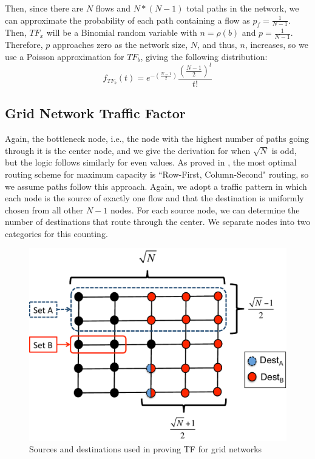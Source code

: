 Then, since there are $N$ flows and $N*(N-1)$ total paths in the network, we can approximate the probability of each path containing a flow as $p_f = \frac{1}{N-1}$.  Then, $TF_x$ will be a Binomial random variable with $n=\rho(b)$ and $p=\frac{1}{N-1}$.  Therefore, $p$ approaches zero as the network size, $N$, and thus, $n$, increases, so we use a Poisson approximation for $TF_b$, giving the following distribution:  
\begin{equation*}
	f_{TF_b}(t) = e^{-(\frac{N-1}{2})}\frac{(\frac{N-1}{2})^{t}}{t!}
\end{equation*} 

\subsection{Grid Network Traffic Factor}

Again, the bottleneck node, i.e., the node with the highest number of paths going through it is the center node, and we give the derivation for when $\sqrt{N}$ is odd, but the logic follows similarly for even values.  As proved in \cite{lattice_nets_cap_opt_routing}, the most optimal routing scheme for maximum capacity is ``Row-First, Column-Second" routing, so we assume paths follow this approach.  Again, we adopt a traffic pattern in which each node is the source of exactly one flow and that the destination is uniformly chosen from all other $N-1$ nodes.  
For each source node, we can determine the number of destinations that route through the center.  We separate nodes into two categories for this counting.

\begin{figure}
\begin{centering}
    \includegraphics[scale=0.39]{figures/TF_proof_fig_color.pdf}
    \caption{Sources and destinations used in proving TF for grid networks}
    \label{fig:TF_proof_fig}
\end{centering}
\end{figure}

